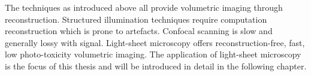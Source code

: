 The techniques as introduced above all provide volumetric imaging through reconstruction.
Structured illumination techniques require computation reconstruction which is prone to artefacts.
Confocal scanning is slow and generally lossy with signal.
Light-sheet microscopy offers reconstruction-free, fast, low photo-toxicity volumetric imaging.
The application of light-sheet microscopy is the focus of this thesis and will be introduced in detail in the following chapter.

